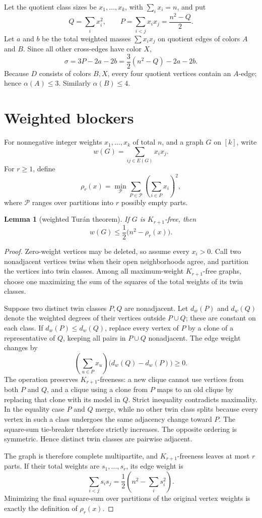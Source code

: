 \documentclass[11pt]{article}
\theoremstyle{plain}
\newtheorem{lemma}[theorem]{Lemma}
\theoremstyle{definition}
\theoremstyle{remark}
\newcommand{\1}{\mathbf 1}
\begin{document}
Let the quotient class sizes be $x_1,\ldots,x_k$, with $\sum_i x_i=n$, and
put
\[
 Q=\sum_i x_i^2,
 \qquad P=\sum_{i<j}x_i x_j=\frac{n^2-Q}{2}.
\]
Let $a$ and $b$ be the total weighted masses $\sum x_i x_j$ on quotient
edges of colors $A$ and $B$.  Since all other cross-edges have color $X$,
\begin{equation}\label{eq:sigmaquot}
 \sigma=3P-2a-2b=\frac32(n^2-Q)-2a-2b.
\end{equation}
Because $D$ consists of colors $B,X$, every four quotient vertices contain an
$A$-edge; hence $\alpha(A)\leq3$.  Similarly $\alpha(B)\leq4$.

\section{Weighted blockers}\label{sec:blocker}

For nonnegative integer weights $x_1,\ldots,x_k$ of total $n$, and a graph
$G$ on $[k]$, write
\[
 w(G)=\sum_{ij\in E(G)}x_i x_j.
\]
For $r\geq1$, define
\[
 \rho_r(x)=\min_{\mathcal P}\sum_{P\in\mathcal P}
 \left(\sum_{i\in P}x_i\right)^2,
\]
where $\mathcal P$ ranges over partitions into $r$ possibly empty parts.

\begin{lemma}[weighted Tur\'an theorem]\label{lem:weighted-turan}
If $G$ is $K_{r+1}$-free, then
\[
 w(G)\leq\frac12\bigl(n^2-\rho_r(x)\bigr).
\]
\end{lemma}

\begin{proof}
Zero-weight vertices may be deleted, so assume every $x_i>0$.  Call two
nonadjacent vertices twins when their open neighborhoods agree, and partition
the vertices into twin classes.  Among all maximum-weight
$K_{r+1}$-free graphs, choose one maximizing the sum of the squares of the
total weights of its twin classes.

Suppose two distinct twin classes $P,Q$ are nonadjacent.  Let $d_w(P)$ and
$d_w(Q)$ denote the weighted degrees of their vertices outside
$P\cup Q$; these are constant on each class.  If
$d_w(P)\leq d_w(Q)$, replace every vertex of $P$ by a clone of a
representative of $Q$, keeping all pairs in $P\cup Q$ nonadjacent.  The edge
weight changes by
\[
 \left(\sum_{u\in P}x_u\right)\bigl(d_w(Q)-d_w(P)\bigr)\geq0.
\]
The operation preserves $K_{r+1}$-freeness: a new clique cannot use vertices
from both $P$ and $Q$, and a clique using a clone from $P$ maps to an old
clique by replacing that clone with its model in $Q$.  Strict inequality
contradicts maximality.  In the equality case $P$ and $Q$ merge, while no
other twin class splits because every vertex in such a class undergoes the
same adjacency change toward $P$.  The square-sum tie-breaker therefore
strictly increases.  The opposite ordering is symmetric.  Hence distinct twin
classes are pairwise adjacent.

The graph is therefore complete multipartite, and $K_{r+1}$-freeness leaves
at most $r$ parts.  If their total weights are $s_1,\ldots,s_r$, its edge
weight is
\[
 \sum_{i<j}s_i s_j=\frac12\left(n^2-\sum_i s_i^2\right).
\]
Minimizing the final square-sum over partitions of the original vertex
weights is exactly the definition of $\rho_r(x)$.
\end{proof}
\end{document}
